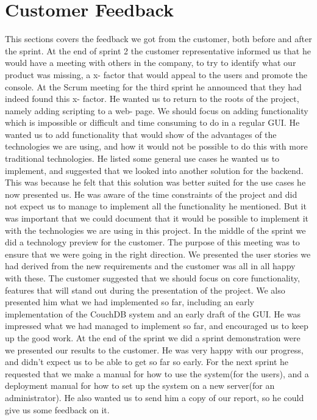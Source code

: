 \section{Customer Feedback}
This sections covers the feedback we got from the customer, both before and after the sprint.
\newline
\newline
At the end of sprint 2 the customer representative informed us that he would have a meeting with others in the company, to try to identify what our product was missing, a x- factor that would appeal to the users and promote the console. At the Scrum meeting for the third sprint he announced that they had indeed found this x- factor. He wanted us to return to the roots of the project, namely adding scripting to a web- page. We should focus on adding functionality which is impossible or difficult and time consuming to do in a regular GUI.
\newline
\newline
He wanted us to add functionality that would show of the advantages of the technologies we are using, and how it would not be possible to do this with more traditional technologies. He listed some general use cases he wanted us to implement, and suggested that we looked into another solution for the backend. This was because he felt that this solution was better suited for the use cases he now presented us. He was aware of the time constraints of the project and did not expect us to manage to implement all the functionality he mentioned. But it was important that we could document that it would be possible to implement it with the technologies we are using in this project.
\newline
\newline
In the middle of the sprint we did a technology preview for the customer. The purpose of this meeting was to ensure that we were going in the right direction. We presented the user stories we had derived from the new requirements and the customer was all in all happy with these. The customer suggested that we should focus on core functionality, features that will stand out during the presentation of the project. We also presented him what we had implemented so far, including an early implementation of the CouchDB system and an early draft of the GUI. He was impressed what we had managed to implement so far, and encouraged us to keep up the good work.
\newline
\newline
At the end of the sprint we did a sprint demonstration were we presented our results to the customer. He was very happy with our progress, and didn't expect us to be able to get so far so early. For the next sprint he requested that we make a manual for how to use the system(for the users), and a deployment manual for how to set up the system on a new server(for an administrator). He also wanted us to send him a copy of our report, so he could give us some feedback on it.

